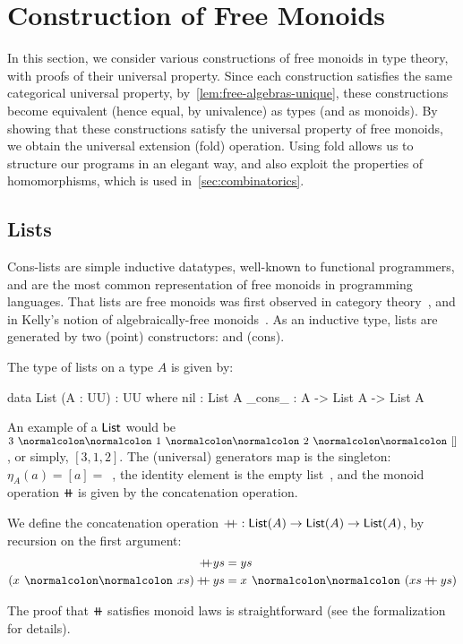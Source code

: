 
\section{Construction of Free Monoids}
\label{sec:monoids}

In this section, we consider various constructions of free monoids in type theory, with proofs of their universal
property.
%
Since each construction satisfies the same categorical universal property, by~\cref{lem:free-algebras-unique},
these constructions become equivalent (hence equal, by univalence) as types (and as monoids).
%
By showing that these constructions satisfy the universal property of free monoids, we obtain the universal extension
(fold) operation.
%
Using fold allows us to structure our programs in an elegant way, and also exploit the properties of homomorphisms,
which is used in~\cref{sec:combinatorics}.

\subsection{Lists}
\label{mon:lists}

Cons-lists are simple inductive datatypes, well-known to functional programmers,
and are the most common representation of free monoids in programming languages.
%
That lists are free monoids was first observed in category theory~\cite{dubucFreeMonoids1974}, and in Kelly's notion of
algebraically-free monoids~\cite{kellyUnifiedTreatmentTransfinite1980}.
%
As an inductive type, lists are generated by two (point) constructors:  and  (cons).
\begin{definition}[Lists]
    \label{def:lists}
    The type of lists on a type $A$ is given by:
    \begin{code}
data List (A : UU) : UU where
  nil : List A
  _cons_ : A -> List A -> List A
\end{code}
\end{definition}

An example of a $\operatorname{\mathsf{List}}$ would be $3 \cons 1 \cons 2 \cons []$, or simply, $[3, 1, 2]$.
%
The (universal) generators map is the singleton: $\eta_A(a) = [a] =$~,
the identity element is the empty list~,
and the monoid operation $\doubleplus$ is given by the concatenation operation.

\begin{definition}[Concatenation]
    We define the concatenation operation $\mathbin{+\kern -0.4em+} : \operatorname{\mathsf{List}}(A) \to \operatorname{\mathsf{List}}(A) \to \operatorname{\mathsf{List}}(A)$,
    by recursion on the first argument:
    \begin{align*}
        [] \doubleplus ys           & = ys                          \\
        (x \cons xs) \doubleplus ys & = x \cons (xs \doubleplus ys)
    \end{align*}
\end{definition}
The proof that $\doubleplus$ satisfies monoid laws is straightforward (see the formalization for details).

